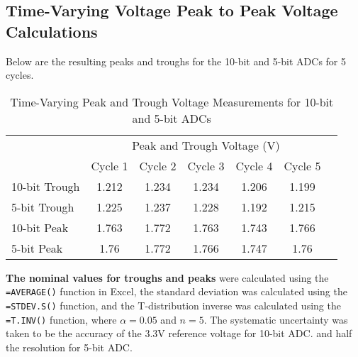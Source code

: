 \subsection{Time-Varying Voltage Peak to Peak Voltage Calculations}
Below are the resulting peaks and troughs for the 10-bit and 5-bit ADCs for 5 cycles. 
\begin{table}
   \centering
   \caption{Time-Varying Peak and Trough Voltage Measurements for 10-bit and 5-bit ADCs}
   \label{tab:time-varying-peak-to-peak-voltage-measurements} 
   \begin{tabular}{lcccccc}
   \toprule
      & \multicolumn{5}{c}{Peak and Trough Voltage (V)}    \\
   \cmidrule{2-6}
      & Cycle 1    & Cycle 2   & Cycle 3   & Cycle 4   & Cycle 5    \\
   \midrule
   10-bit Trough & 1.212 & 1.234 & 1.234 & 1.206 & 1.199  \\
   5-bit Trough  & 1.225 & 1.237 & 1.228 & 1.192 & 1.215  \\
   10-bit Peak   & 1.763 & 1.772 & 1.763 & 1.743 & 1.766  \\
   5-bit Peak    & 1.76  & 1.772 & 1.766 & 1.747 & 1.76   \\
   \bottomrule
   \end{tabular}
\end{table}


\noindent \textbf{The nominal values for troughs and peaks} were calculated using the \texttt{=AVERAGE()} function in Excel, the standard deviation 
was calculated using the \texttt{=STDEV.S()} function, and the T-distribution inverse was calculated using the \texttt{=T.INV()} function, where $\alpha = 0.05$ 
and $n = 5$. The systematic uncertainty was taken to be the accuracy of the 3.3V reference voltage for 10-bit ADC. and half the resolution for 5-bit ADC.

